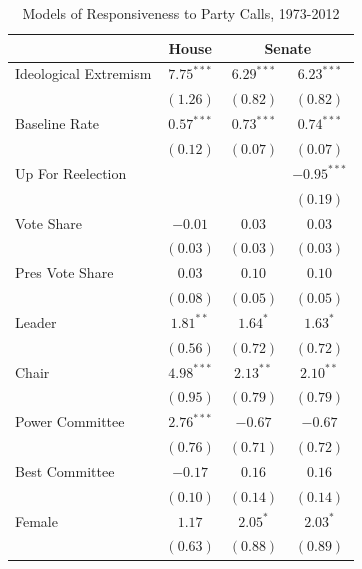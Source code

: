 \documentclass[12pt]{article}
\begin{document}
\begin{table}[!htbp]
\centering
\begin{threeparttable}
\caption{Models of Responsiveness to Party Calls, 1973-2012}
\label{tab-responsiveness-regressions}
\singlespacing
\begin{tabular}{l c c c }
\hline
& House & \multicolumn{2}{c}{Senate} \\
\hline

Ideological Extremism & $7.75^{***}$ & $6.29^{***}$ & $6.23^{***}$  \\
                      & $(1.26)$     & $(0.82)$     & $(0.82)$      \\
Baseline Rate         & $0.57^{***}$ & $0.73^{***}$ & $0.74^{***}$  \\
                      & $(0.12)$     & $(0.07)$     & $(0.07)$      \\
Up For Reelection     &              &              & $-0.95^{***}$ \\
                      &              &              & $(0.19)$      \\
Vote Share            & $-0.01$      & $0.03$       & $0.03$        \\
                      & $(0.03)$     & $(0.03)$     & $(0.03)$      \\
Pres Vote Share       & $0.03$       & $0.10$       & $0.10$        \\
                      & $(0.08)$     & $(0.05)$     & $(0.05)$      \\
Leader                & $1.81^{**}$  & $1.64^{*}$   & $1.63^{*}$    \\
                      & $(0.56)$     & $(0.72)$     & $(0.72)$      \\
Chair                 & $4.98^{***}$ & $2.13^{**}$  & $2.10^{**}$   \\
                      & $(0.95)$     & $(0.79)$     & $(0.79)$      \\
Power Committee       & $2.76^{***}$ & $-0.67$      & $-0.67$       \\
                      & $(0.76)$     & $(0.71)$     & $(0.72)$      \\
Best Committee        & $-0.17$      & $0.16$       & $0.16$        \\
                      & $(0.10)$     & $(0.14)$     & $(0.14)$      \\
Female                & $1.17$       & $2.05^{*}$   & $2.03^{*}$    \\
                      & $(0.63)$     & $(0.88)$     & $(0.89)$      \\

\end{tabular}
\end{threeparttable}
\end{table}
\end{document}
